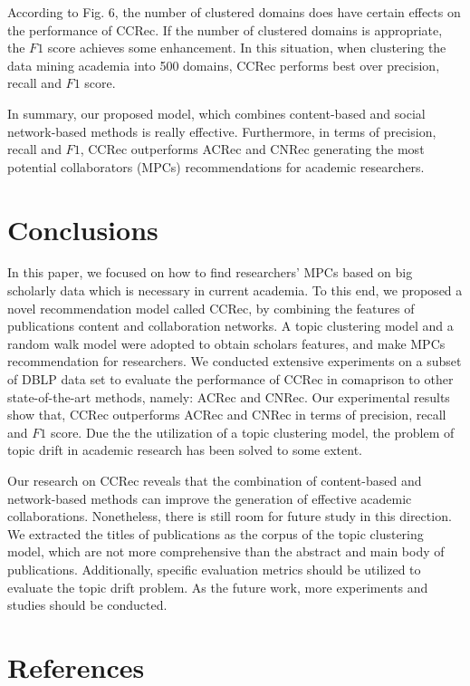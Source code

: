 \documentclass[review]{elsarticle}
\begin{document}
According to Fig. 6, the number of clustered domains does have certain effects on the performance of CCRec. If the number of clustered domains is appropriate, the $F1$ score achieves some enhancement. In this situation, when clustering the data mining academia into 500 domains, CCRec performs best over precision, recall and $F1$ score.

In summary, our proposed model, which combines content-based and social network-based methods is really effective. Furthermore, in terms of precision, recall and $F1$, CCRec outperforms ACRec and CNRec generating the most potential collaborators (MPCs) recommendations for academic researchers.
\section{Conclusions}
In this paper, we focused on how to find researchers' MPCs based on big scholarly data which is necessary in current academia. To this end, we proposed a novel recommendation model called CCRec, by combining the features of publications content and collaboration networks. A topic clustering model and a random walk model were adopted to obtain scholars features, and make MPCs recommendation for researchers. We conducted extensive experiments on a subset of DBLP data set to evaluate the performance of CCRec in comaprison to other state-of-the-art methods, namely: ACRec and CNRec. Our experimental results show that, CCRec outperforms ACRec and CNRec in terms of precision, recall and $F1$ score. Due the the utilization of a topic clustering model, the problem of topic drift in academic research has been solved to some extent.

Our research on CCRec reveals that the combination of content-based and network-based methods can improve the generation of effective academic collaborations. Nonetheless, there is still room for future study in this direction. We extracted the titles of publications as the corpus of the topic clustering model, which are not more comprehensive than the abstract and main body of publications. Additionally, specific evaluation metrics should be utilized to evaluate the topic drift problem. As the future work, more experiments and studies should be conducted.

\section*{References}


\end{document}
